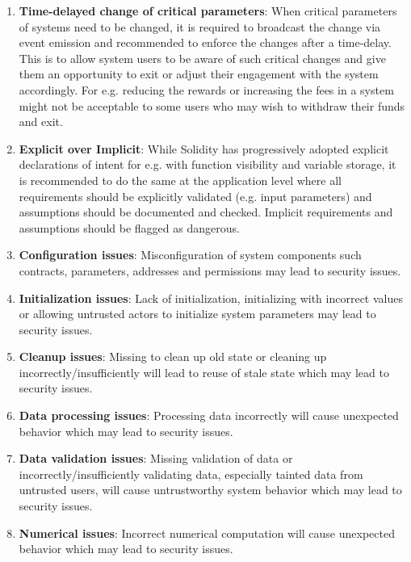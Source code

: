 \begin{enumerate}
\item\textbf{Time-delayed change of critical parameters}: When critical parameters of systems need to be changed, it is required to broadcast the change via event emission and recommended to enforce the changes after a time-delay. This is to allow system users to be aware of such critical changes and give them an opportunity to exit or adjust their engagement with the system accordingly. For e.g. reducing the rewards or increasing the fees in a system might not be acceptable to some users who may wish to withdraw their funds and exit.

\item\textbf{Explicit over Implicit}: While Solidity has progressively adopted explicit declarations of intent for e.g. with function visibility and variable storage, it is recommended to do the same at the application level where all requirements should be explicitly validated (e.g. input parameters) and assumptions should be documented and checked. Implicit requirements and assumptions should be flagged as dangerous.

\item\textbf{Configuration issues}: Misconfiguration of system components such contracts, parameters, addresses and permissions may lead to security issues.

\item\textbf{Initialization issues}: Lack of initialization, initializing with incorrect values or allowing untrusted actors to initialize system parameters may lead to security issues.

\item\textbf{Cleanup issues}: Missing to clean up old state or cleaning up incorrectly/insufficiently will lead to reuse of stale state which may lead to security issues.

\item\textbf{Data processing issues}: Processing data incorrectly will cause unexpected behavior which may lead to security issues.

\item\textbf{Data validation issues}: Missing validation of data or incorrectly/insufficiently validating data, especially tainted data from untrusted users, will cause untrustworthy system behavior which may lead to security issues.

\item\textbf{Numerical issues}: Incorrect numerical computation will cause unexpected behavior which may lead to security issues.


\end{enumerate}
